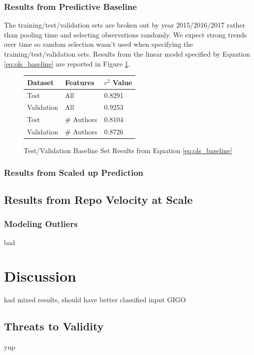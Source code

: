 \documentclass{article}
\begin{document}
\subsubsection{Results from Predictive Baseline}

The training/test/validation sets are broken out by year 2015/2016/2017
rather than pooling time and selecting observations randomly. We expect
strong trends over time so random selection wasn't used when specifying the
training/test/validation sets. Results from the linear model specified
by Equation \ref{eq:ols_baseline} are reported in Figure
\ref{fig:ols_baseline}. 

\begin{figure}[h]
  \centering
  \begin{tabular}{ l|l|l }
    Dataset & Features & $r^2$ Value \\
    \hline
    Test       & All        & 0.8291 \\
    Validation & All        & 0.9253 \\
    Test       & \# Authors & 0.8104 \\
    Validation & \# Authors & 0.8726 \\
  \end{tabular}
  \caption{Test/Validation Baseline Set Results from Equation
    \ref{eq:ols_baseline}}
  \label{fig:ols_baseline}
\end{figure}


\subsubsection{Results from Scaled up Prediction}

\subsection{Results from Repo Velocity at Scale}


\subsubsection{Modeling Outliers}

bad 

\section{Discussion}

had mixed results, should have better classified input GIGO

\subsection{Threats to Validity}

 yup



\end{document}
